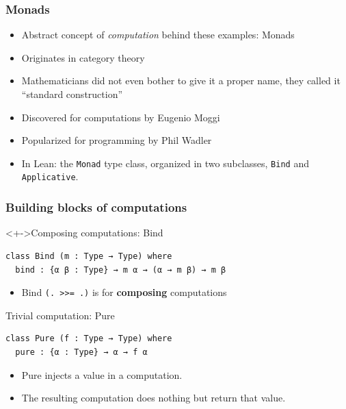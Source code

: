 \documentclass{beamer}
\begin{document}
\begin{frame}
  \frametitle{Monads}
  \begin{itemize}
  \item Abstract concept of \emph{computation} behind these
    examples: Monads
  \item Originates in category theory
  \item Mathematicians did not even bother to give it a proper name,
    they called it ``standard construction''
  \item Discovered for computations by Eugenio Moggi
  \item Popularized for programming by Phil Wadler
  \item In Lean: the \lstinline{Monad} type class, organized in two subclasses,
    \lstinline{Bind} and \lstinline{Applicative}.
  \end{itemize}
\end{frame}

\begin{frame}[fragile]
  \frametitle{Building blocks of computations}
  \begin{block}<+->{Composing computations: Bind}
\begin{lstlisting}
class Bind (m : Type → Type) where
  bind : {α β : Type} → m α → (α → m β) → m β
\end{lstlisting}
    \begin{itemize}
    \item Bind \lstinline{(. >>= .)} is for \textbf{composing} computations
    \end{itemize}
  \end{block}
  \begin{block}{Trivial computation: Pure}
\begin{lstlisting}
class Pure (f : Type → Type) where
  pure : {α : Type} → α → f α
\end{lstlisting}
    \begin{itemize}
    \item Pure injects a value in a computation.
    \item The resulting computation does nothing but return that value.
    \end{itemize}
  \end{block}
\end{frame}
\end{document}
